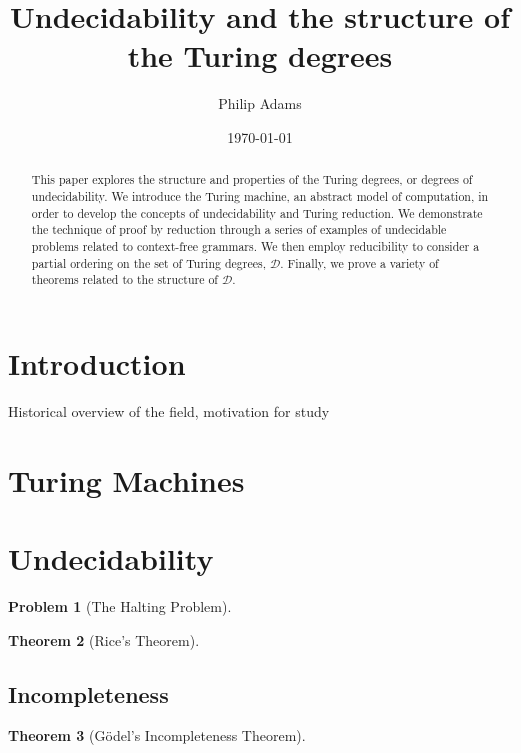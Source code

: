 \documentclass[psamsfonts]{amsart}
\title{Undecidability and the structure of the Turing degrees}
\author{Philip Adams}
\date{\today}
\newtheorem{thm}{Theorem}[section]
\newtheorem{prob}[thm]{Problem}
\theoremstyle{definition}
\theoremstyle{remark}
\numberwithin{equation}{section}
\begin{document}
\begin{abstract}

  This paper explores the structure and properties of the Turing degrees, or
  degrees of undecidability. We introduce the Turing machine, an abstract model
  of computation, in order to develop the concepts of undecidability and Turing
  reduction. We demonstrate the technique of proof by reduction through a series
  of examples of undecidable problems related to context-free grammars. We then
  employ reducibility to consider a partial ordering on the set of Turing degrees, $\mathcal{D}$. Finally, we prove a variety of theorems
  related to the structure of $\mathcal{D}$. 

\end{abstract}

\maketitle

\tableofcontents

\section{Introduction}
Historical overview of the field, motivation for study
\cite{ambos-spies06:_degrees_unsol}
\cite{soare16_turin_comput}
\cite{soare1999history}
\cite{lerman16:_degrees_unsol}


\section{Turing Machines}
\cite{turing37_comput_number_with_applic_to_entsc}
\section{Undecidability}


\begin{prob}[The Halting Problem]
  \cite{turing37_comput_number_with_applic_to_entsc}
  \cite{sipser13:_introd_theor_comput}
\end{prob}
\begin{thm}[Rice's Theorem] \cite{kozen99_autom}
\end{thm}
\subsection{Incompleteness}
\begin{thm}[G\"odel's Incompleteness Theorem] 
  \cite{kleene43_recur_predic_quant}
\end{thm}
\end{document}
